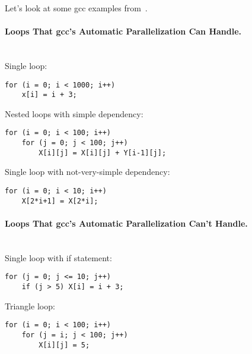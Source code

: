 Let's look at some gcc examples from~\cite{autopar:related}.

\paragraph{Loops That gcc's Automatic Parallelization Can Handle.}~\\

  Single loop:
  \begin{verbatim}
for (i = 0; i < 1000; i++)
    x[i] = i + 3;
  \end{verbatim}

  Nested loops with simple dependency:
  \begin{verbatim}
for (i = 0; i < 100; i++)
    for (j = 0; j < 100; j++)
        X[i][j] = X[i][j] + Y[i-1][j];
  \end{verbatim}

  Single loop with not-very-simple dependency:
  \begin{verbatim}
for (i = 0; i < 10; i++)
    X[2*i+1] = X[2*i];
  \end{verbatim}

\paragraph{Loops That gcc's Automatic Parallelization Can't Handle.}~\\

  Single loop with if statement:
  \begin{verbatim}
for (j = 0; j <= 10; j++)
    if (j > 5) X[i] = i + 3;
  \end{verbatim}

  Triangle loop:
  \begin{verbatim}
for (i = 0; i < 100; i++)
    for (j = i; j < 100; j++)
        X[i][j] = 5;
  \end{verbatim}

